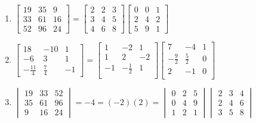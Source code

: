 \begin{Answer}
\begin{enumerate}[label=(\alph*)]
\item $\begin{bmatrix}
19 & 35 & 9 \\
33 & 61 & 16 \\
52 & 96 & 24
\end{bmatrix}
=
\begin{bmatrix}
2 & 2 & 3\\
3 & 4 & 5\\
4 & 6 & 8
\end{bmatrix} 
\begin{bmatrix}
0 & 0 & 1\\
2 & 4 & 2\\
5 & 9 & 1
\end{bmatrix}$
\item $
\begin{bmatrix}
18 & -10 & 1 \\
-6 & 3 & 1 \\
-\frac{11}{4} & \frac{7}{4} & - 1
\end{bmatrix}
=
\begin{bmatrix}
1 & -2 & 1 \\
1 & 2 & -2 \\
-1 & -\frac{1}{2} & 1 \\
\end{bmatrix}
\begin{bmatrix}
7 & -4 & 1 \\
-\frac{9}{2} & \frac{5}{2} & 0 \\
2 & -1 & 0 \\
\end{bmatrix}$
\item
$ \begin{vmatrix}
19 & 33 & 52 \\
35 & 61 & 96 \\
9 & 16 & 24
\end{vmatrix} = -4 = (-2)(2) =
\begin{vmatrix}
0 & 2 & 5\\
0 & 4 & 9\\
1 & 2 & 1
\end{vmatrix}
\begin{vmatrix}
2 & 3 & 4\\
2 & 4 & 6\\
3 & 5 & 8
\end{vmatrix}$
\end{enumerate}
\end{Answer}

